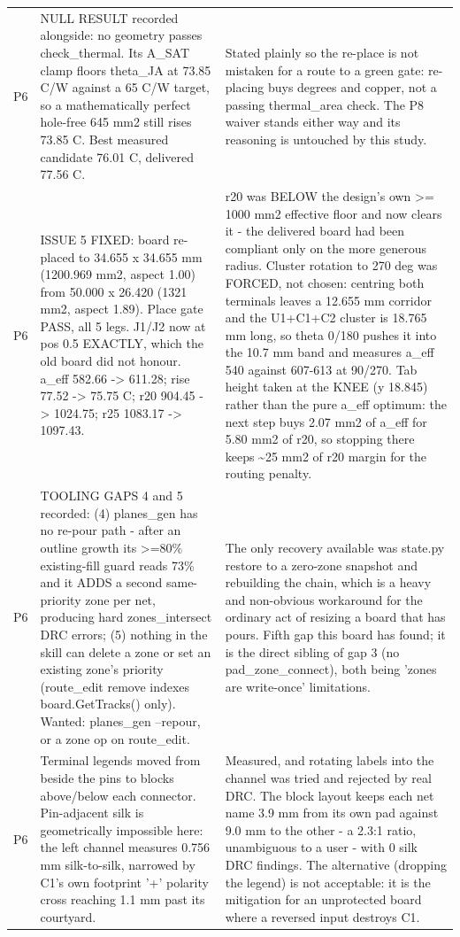 \documentclass[11pt,a4paper]{article}
\begin{document}
{\begin{longtable}{lp{5.2cm}p{7.2cm}}
P6 & NULL RESULT recorded alongside: no geometry passes check\_thermal. Its A\_SAT clamp floors theta\_JA at 73.85 C/W against a 65 C/W target, so a mathematically perfect hole-free 645 mm2 still rises 73.85 C. Best measured candidate 76.01 C, delivered 77.56 C. & Stated plainly so the re-place is not mistaken for a route to a green gate: re-placing buys degrees and copper, not a passing thermal\_area check. The P8 waiver stands either way and its reasoning is untouched by this study. \\
P6 & ISSUE 5 FIXED: board re-placed to 34.655 x 34.655 mm (1200.969 mm2, aspect 1.00) from 50.000 x 26.420 (1321 mm2, aspect 1.89). Place gate PASS, all 5 legs. J1/J2 now at pos 0.5 EXACTLY, which the old board did not honour. a\_eff 582.66 -\textgreater{} 611.28; rise 77.52 -\textgreater{} 75.75 C; r20 904.45 -\textgreater{} 1024.75; r25 1083.17 -\textgreater{} 1097.43. & r20 was BELOW the design's own \textgreater{}= 1000 mm2 effective floor and now clears it - the delivered board had been compliant only on the more generous radius. Cluster rotation to 270 deg was FORCED, not chosen: centring both terminals leaves a 12.655 mm corridor and the U1+C1+C2 cluster is 18.765 mm long, so theta 0/180 pushes it into the 10.7 mm band and measures a\_eff 540 against 607-613 at 90/270. Tab height taken at the KNEE (y 18.845) rather than the pure a\_eff optimum: the next step buys 2.07 mm2 of a\_eff for 5.80 mm2 of r20, so stopping there keeps \textasciitilde{}25 mm2 of r20 margin for the routing penalty. \\
P6 & TOOLING GAPS 4 and 5 recorded: (4) planes\_gen has no re-pour path - after an outline growth its \textgreater{}=80\% existing-fill guard reads 73\% and it ADDS a second same-priority zone per net, producing hard zones\_intersect DRC errors; (5) nothing in the skill can delete a zone or set an existing zone's priority (route\_edit remove indexes board.GetTracks() only). Wanted: planes\_gen --repour, or a zone op on route\_edit. & The only recovery available was state.py restore to a zero-zone snapshot and rebuilding the chain, which is a heavy and non-obvious workaround for the ordinary act of resizing a board that has pours. Fifth gap this board has found; it is the direct sibling of gap 3 (no pad\_zone\_connect), both being 'zones are write-once' limitations. \\
P6 & Terminal legends moved from beside the pins to blocks above/below each connector. Pin-adjacent silk is geometrically impossible here: the left channel measures 0.756 mm silk-to-silk, narrowed by C1's own footprint '+' polarity cross reaching 1.1 mm past its courtyard. & Measured, and rotating labels into the channel was tried and rejected by real DRC. The block layout keeps each net name 3.9 mm from its own pad against 9.0 mm to the other - a 2.3:1 ratio, unambiguous to a user - with 0 silk DRC findings. The alternative (dropping the legend) is not acceptable: it is the mitigation for an unprotected board where a reversed input destroys C1. \\

\end{longtable}}
\end{document}
